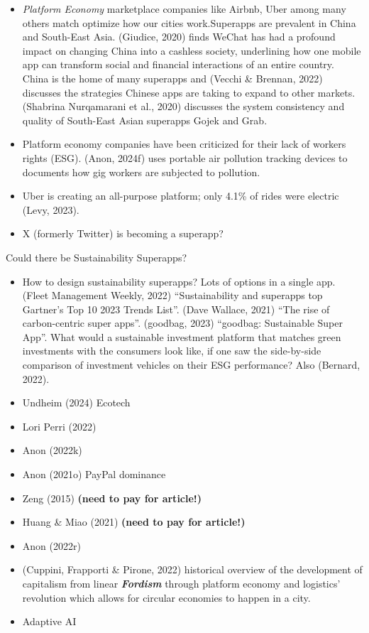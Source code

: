 \documentclass[
  letterpaper,
  DIV=11,
  numbers=noendperiod]{scrartcl}
\begin{document}
\begin{itemize}
\item
  \emph{Platform Economy} marketplace companies like Airbnb, Uber among
  many others match optimize how our cities work.Superapps are prevalent
  in China and South-East Asia. (Giudice, 2020) finds WeChat has had a
  profound impact on changing China into a cashless society, underlining
  how one mobile app can transform social and financial interactions of
  an entire country. China is the home of many superapps and (Vecchi \&
  Brennan, 2022) discusses the strategies Chinese apps are taking to
  expand to other markets. (Shabrina Nurqamarani et al., 2020) discusses
  the system consistency and quality of South-East Asian superapps Gojek
  and Grab.
\item
  Platform economy companies have been criticized for their lack of
  workers rights (ESG). (Anon, 2024f) uses portable air pollution
  tracking devices to documents how gig workers are subjected to
  pollution.
\item
  Uber is creating an all-purpose platform; only 4.1\% of rides were
  electric (Levy, 2023).
\item
  X (formerly Twitter) is becoming a superapp?
\end{itemize}

Could there be Sustainability Superapps?

\begin{itemize}
\item
  How to design sustainability superapps? Lots of options in a single
  app. (Fleet Management Weekly, 2022) ``Sustainability and superapps
  top Gartner's Top 10 2023 Trends List''. (Dave Wallace, 2021) ``The
  rise of carbon-centric super apps''. (goodbag, 2023) ``goodbag:
  Sustainable Super App''. What would a sustainable investment platform
  that matches green investments with the consumers look like, if one
  saw the side-by-side comparison of investment vehicles on their ESG
  performance? Also (Bernard, 2022).
\item
  Undheim (2024) Ecotech
\item
  Lori Perri (2022)
\item
  Anon (2022k)
\item
  Anon (2021o) PayPal dominance
\item
  Zeng (2015) \textbf{(need to pay for article!)}
\item
  Huang \& Miao (2021) \textbf{(need to pay for article!)}
\item
  Anon (2022r)
\item
  (Cuppini, Frapporti \& Pirone, 2022) historical overview of the
  development of capitalism from linear \textbf{\emph{Fordism}} through
  platform economy and logistics' revolution which allows for circular
  economies to happen in a city.
\item
  Adaptive AI
\end{itemize}
\end{document}
